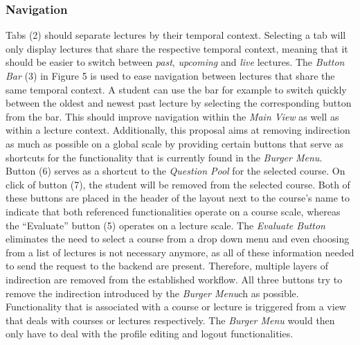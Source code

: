 \subsubsection{Navigation}
Tabs (2) should separate lectures by their temporal context. Selecting a tab will only display lectures that share the respective temporal context, meaning that it should be easier to switch between \emph{past}, \emph{upcoming} and \emph{live} lectures.
The \emph{Button Bar} (3) in Figure 5 is used to ease navigation between lectures that share the same temporal context. A student can use the bar for example to switch quickly between the oldest and newest past lecture by selecting the corresponding button from the bar. This should improve navigation within the \emph{Main View} as well as within a lecture context. 
Additionally, this proposal aims at removing indirection as much as possible on a global scale by providing certain buttons that serve as shortcuts for the functionality that is currently found in the \emph{Burger Menu}. Button (6) serves as a shortcut to the \emph{Question Pool} for the selected course. On click of button (7), the student will be removed from the selected course. Both of these buttons are placed in the header of the layout next to the course’s name to indicate that both referenced functionalities operate on a course scale, whereas the “Evaluate” button (5) operates on a lecture scale. The \emph{Evaluate Button} eliminates the need to select a course from a drop down menu and even choosing from a list of lectures is not necessary anymore, as all of these information needed to send the request to the backend are present. Therefore, multiple layers of indirection are removed from the established workflow. All three buttons try to remove the indirection introduced by the \emph{Burger Menu}ch as possible. Functionality that is associated with a course or lecture is triggered from a view that deals with courses or lectures respectively. The \emph{Burger Menu} would then only have to deal with the profile editing and  logout functionalities.

